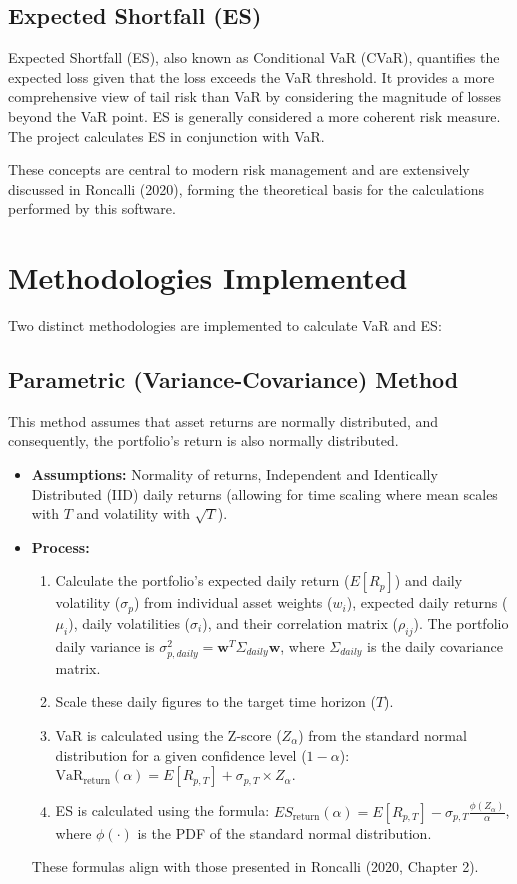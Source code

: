 \documentclass[11pt,a4paper]{article}
\begin{document}
\subsection{Expected Shortfall (ES)}
Expected Shortfall (ES), also known as Conditional VaR (CVaR), quantifies the expected loss given that the loss exceeds the VaR threshold. It provides a more comprehensive view of tail risk than VaR by considering the magnitude of losses beyond the VaR point. ES is generally considered a more coherent risk measure. The project calculates ES in conjunction with VaR.

These concepts are central to modern risk management and are extensively discussed in Roncalli (2020), forming the theoretical basis for the calculations performed by this software.

\section{Methodologies Implemented}
Two distinct methodologies are implemented to calculate VaR and ES:

\subsection{Parametric (Variance-Covariance) Method}
This method assumes that asset returns are normally distributed, and consequently, the portfolio's return is also normally distributed. 
\begin{itemize}
    \item \textbf{Assumptions:} Normality of returns, Independent and Identically Distributed (IID) daily returns (allowing for time scaling where mean scales with $T$ and volatility with $\sqrt{T}$).
    \item \textbf{Process:}
    \begin{enumerate}
        \item Calculate the portfolio's expected daily return ($E[R_p]$) and daily volatility ($\sigma_p$) from individual asset weights ($w_i$), expected daily returns ($\mu_i$), daily volatilities ($\sigma_i$), and their correlation matrix ($\rho_{ij}$). The portfolio daily variance is $\sigma^2_{p,daily} = \mathbf{w}^T \Sigma_{daily} \mathbf{w}$, where $\Sigma_{daily}$ is the daily covariance matrix.
        \item Scale these daily figures to the target time horizon ($T$).
        \item VaR is calculated using the Z-score ($Z_{\alpha}$) from the standard normal distribution for a given confidence level ($1-\alpha$): 
        $\text{VaR}_{\text{return}}(\alpha) = E[R_{p,T}] + \sigma_{p,T} \times Z_{\alpha}$.
        \item ES is calculated using the formula: 
        $ES_{\text{return}}(\alpha) = E[R_{p,T}] - \sigma_{p,T} \frac{\phi(Z_{\alpha})}{\alpha}$, where $\phi(\cdot)$ is the PDF of the standard normal distribution.
    \end{enumerate}
    These formulas align with those presented in Roncalli (2020, Chapter 2).
\end{itemize}
\end{document}
